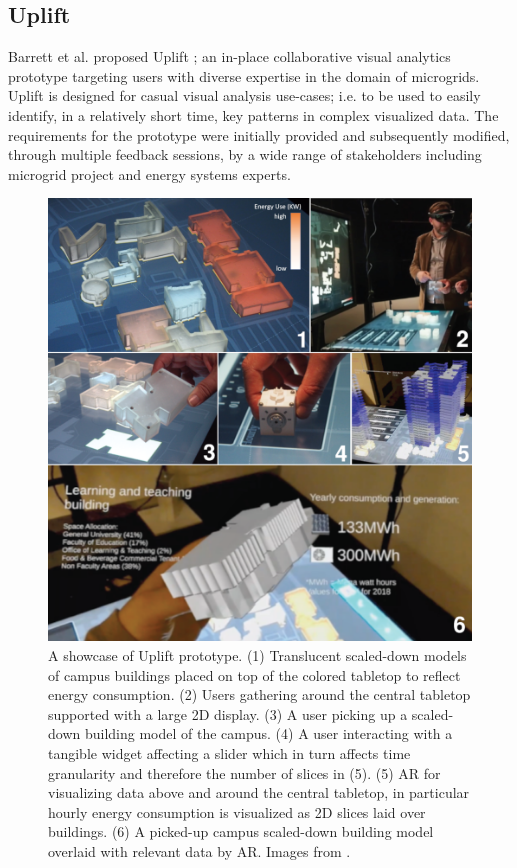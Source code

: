 \documentclass{vgtc}                          %
\begin{document}
\subsection{Uplift}
Barrett et al. proposed Uplift \cite{uplift_prototype}; an in-place
collaborative visual analytics prototype targeting users with diverse
expertise in the domain of microgrids. Uplift is designed for casual visual
analysis use-cases; i.e. to be used to easily identify, in a relatively short
time, key patterns in complex visualized data. The requirements for the
prototype were initially provided and subsequently modified, through multiple
feedback sessions, by a wide range of stakeholders including microgrid project
and energy systems experts.

\begin{figure}[tb]
	\centering
	\includegraphics[width=\columnwidth]{uplift}
	\caption[Caption for Uplift]{A showcase of Uplift prototype. (1)
		Translucent scaled-down models of campus buildings placed on top of the
		colored tabletop to reflect energy consumption. (2) Users gathering
		around the central tabletop supported with a large 2D display. (3)
		A user picking up a scaled-down building model of the campus. (4)
		A user interacting with a tangible widget affecting a slider which
		in turn affects time granularity and therefore the number of slices
		in (5). (5) AR for visualizing data above and around the central
		tabletop, in particular hourly energy consumption is visualized as 2D
		slices laid over buildings. (6) A picked-up campus scaled-down building
		model overlaid with relevant data by AR.
		Images from \cite{uplift_prototype}.}
	\label{fig:uplift}
\end{figure}
\end{document}
